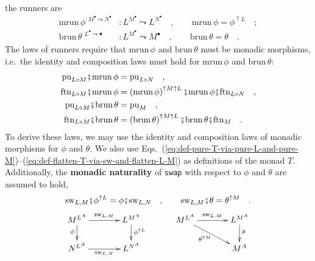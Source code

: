 the runners are
\begin{align*}
\text{mrun}\,\phi^{:M^{\bullet}\leadsto N^{\bullet}} & :L^{M^{\bullet}}\leadsto L^{N^{\bullet}}\quad,\quad\quad\text{mrun}\,\phi=\phi^{\uparrow L}\quad;\\
\text{brun}\,\theta^{:L^{\bullet}\leadsto\bullet} & :L^{M^{\bullet}}\leadsto M^{\bullet}\quad,\quad\quad\text{brun}\,\theta=\theta\quad.
\end{align*}
The laws of runners require that $\text{mrun}\,\phi$ and $\text{brun}\,\theta$
must be monadic morphisms, i.e.~the identity and composition laws
must hold for $\text{mrun}\,\phi$ and $\text{brun}\,\theta$:
\begin{align*}
\text{pu}_{L\circ M}\bef\text{mrun}\,\phi & =\text{pu}_{L\circ N}\quad,\\
\text{ftn}_{L\circ M}\bef\text{mrun}\,\phi & =\left(\text{mrun}\,\phi\right)^{\uparrow M\uparrow L}\bef\text{mrun}\,\phi\bef\text{ftn}_{L\circ N}\quad,\\
\text{pu}_{L\circ M}\bef\text{brun}\,\theta & =\text{pu}_{M}\quad,\\
\text{ftn}_{L\circ M}\bef\text{brun}\,\theta & =\left(\text{brun}\,\theta\right)^{\uparrow M\uparrow L}\bef\text{brun}\,\theta\bef\text{ftn}_{M}\quad.
\end{align*}
To derive these laws, we may use the identity and composition laws
of monadic morphisms for $\phi$ and $\theta$. We also use Eqs.~(\ref{eq:def-pure-T-via-pure-L-and-pure-M})–(\ref{eq:def-flatten-T-via-sw-and-flatten-L-M})
as definitions of the monad $T$. Additionally, the \textbf{monadic
naturality} of \lstinline!swap!
with respect to $\phi$ and $\theta$ are assumed to hold,
\[
\text{sw}_{L,M}\bef\phi^{\uparrow L}=\phi\bef\text{sw}_{L,N}\quad,\quad\quad\text{sw}_{L,M}\bef\theta=\theta^{\uparrow M}\quad.
\]
\[
\xymatrix{\xyScaleY{1.5pc}\xyScaleX{3pc}M^{L^{A}}\ar[r]\sp(0.5){\text{sw}_{L,M}}\ar[d]\sb(0.4){\phi} & L^{M^{A}}\ar[d]\sp(0.4){\phi^{\uparrow L}} & M^{L^{A}}\ar[r]\sp(0.5){\text{sw}_{L,M}}\ar[rd]\sb(0.45){\theta^{\uparrow M}} & L^{M^{A}}\ar[d]\sp(0.4){\theta}\\
N^{L^{A}}\ar[r]\sb(0.5){\text{sw}_{L,N}} & L^{N^{A}} &  & M^{A}
}
\]

